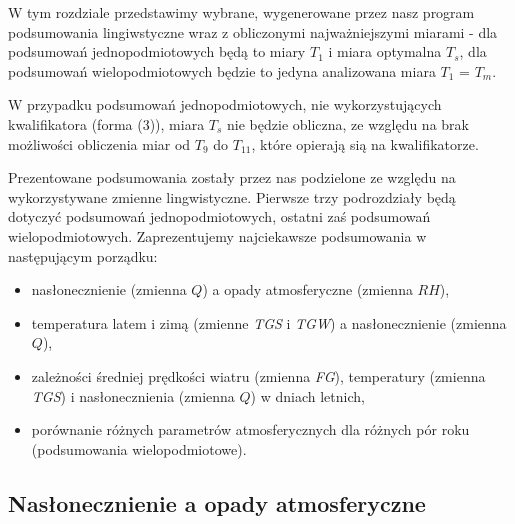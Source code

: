 \documentclass{classrep}
\begin{document}
W tym rozdziale przedstawimy wybrane, wygenerowane przez nasz program podsumowania lingiwstyczne wraz z obliczonymi najważniejszymi miarami - dla podsumowań jednopodmiotowych będą to miary $T_1$ i miara optymalna $T_s$, dla podsumowań wielopodmiotowych będzie to jedyna analizowana miara $T_1$ = $T_m$.\newline

W przypadku podsumowań jednopodmiotowych, nie wykorzystujących kwalifikatora (forma (3)), miara $T_s$ nie będzie obliczna, ze względu na brak możliwości obliczenia miar od $T_9$ do $T_{11}$, które opierają sią na kwalifikatorze.\newline

Prezentowane podsumowania zostały przez nas podzielone ze względu na wykorzystywane zmienne lingwistyczne. Pierwsze trzy podrozdziały będą dotyczyć podsumowań jednopodmiotowych, ostatni zaś podsumowań wielopodmiotowych. Zaprezentujemy najciekawsze podsumowania w następującym porządku:

\begin{itemize}[label=$\bullet$\scshape\bfseries]
\item nasłonecznienie (zmienna $Q$) a opady atmosferyczne (zmienna $RH$),
\item temperatura latem i zimą (zmienne \textit{TGS} i \textit{TGW}) a nasłonecznienie (zmienna $Q$),
\item zależności średniej prędkości wiatru (zmienna \textit{FG}), temperatury (zmienna \textit{TGS}) i nasłonecznienia (zmienna $Q$) w dniach letnich,
\item porównanie różnych parametrów atmosferycznych dla różnych pór roku (podsumowania wielopodmiotowe).
\end{itemize}

\clearpage

\subsection{Nasłonecznienie a opady atmosferyczne}
\end{document}
